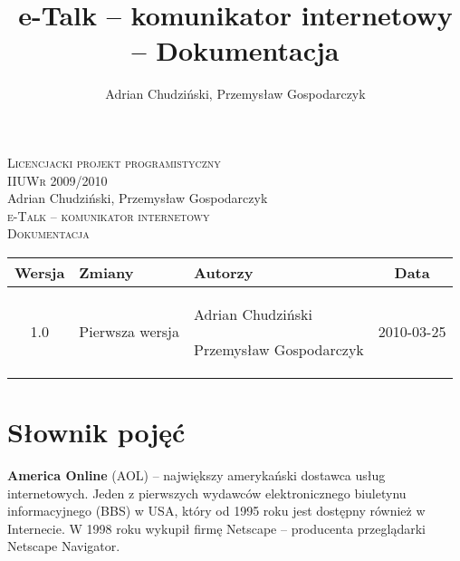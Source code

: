 \documentclass[a4paper,12pt]{article}
\author{Adrian Chudziński, Przemysław Gospodarczyk}
\title{e-Talk -- komunikator internetowy -- Dokumentacja}
\begin{document}
\makeatletter
    \renewcommand\@seccntformat[1]{\csname the#1\endcsname.\quad}
    \renewcommand\numberline[1]{#1.\hskip0.7em}
\makeatother

\begin{titlepage}
\begin{center}

    \textsc{Licencjacki projekt programistyczny}\\[0.1cm]
    \textsc{IIUWr 2009/2010}\\[6cm]
    Adrian Chudziński, Przemysław Gospodarczyk\\[1cm]
    \textsc{\Large e-Talk -- komunikator internetowy}\\[0.25cm]
    \textsc{\large Dokumentacja}\\[8.675cm]

    {\footnotesize
    \begin{tabular}{| c | p{4cm} | p{4.25cm} | c | }
        \hline
        Wersja  &
        Zmiany  &
        Autorzy &
        Data    \\
        \hline
        1.0                                                                   &
        Pierwsza wersja                                                       &
        \par Adrian Chudziński \par Przemysław Gospodarczyk                                                  &
        2010-03-25                                                            \\
        \hline
    \end{tabular}
    }

\end{center}
\end{titlepage}

\break

\setcounter{page}{2}

\tableofcontents

\break
\section[Słownik pojęć]{Słownik pojęć}
\noindent\textbf{America Online} (AOL) -- największy amerykański dostawca usług internetowych. Jeden z pierwszych wydawców elektronicznego biuletynu informacyjnego (BBS) w USA, który od 1995 roku jest dostępny również w Internecie. W 1998 roku wykupił firmę Netscape -- producenta przeglądarki Netscape Navigator.\\
\end{document}
